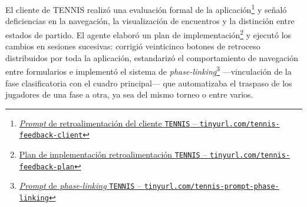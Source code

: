 El cliente de \ac{TENNIS} realizó una evaluación formal de la aplicación\footnote{\href{https://github.com/alu0101549491/TFG-Fabian-Gonzalez-Lence/blob/main/resources/prompts/5-TennisTournamentManager/6-FeedbackDeLaAplicacion/client-feedback.prompt.md}{\textit{Prompt} de retroalimentación del cliente \texttt{TENNIS} -- \texttt{tinyurl.com/tennis-feedback-client}}} y señaló deficiencias en la navegación, la visualización de encuentros y la distinción entre estados de partido. El agente elaboró un plan de implementación\footnote{\href{https://github.com/alu0101549491/TFG-Fabian-Gonzalez-Lence/blob/main/projects/5-TennisTournamentManager/docs/FEEDBACK-IMPLEMENTATION-PLAN.md}{Plan de implementación retroalimentación \texttt{TENNIS} -- \texttt{tinyurl.com/tennis-feedback-plan}}} y ejecutó los cambios en sesiones sucesivas: corrigió veinticinco botones de retroceso distribuidos por toda la aplicación, estandarizó el comportamiento de navegación entre formularios e implementó el sistema de \textit{phase-linking}\footnote{\href{https://github.com/alu0101549491/TFG-Fabian-Gonzalez-Lence/blob/main/resources/prompts/5-TennisTournamentManager/6-FeedbackDeLaAplicacion/phase-linking.prompt.md}{\textit{Prompt} de \textit{phase-linking} \texttt{TENNIS} -- \texttt{tinyurl.com/tennis-prompt-phase-linking}}} ---vinculación de la fase clasificatoria con el cuadro principal--- que automatizaba el traspaso de los jugadores de una fase a otra, ya sea del mismo torneo o entre varios.
